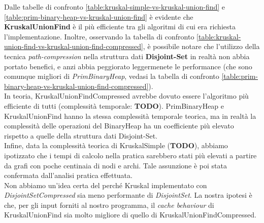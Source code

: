 \noindent Dalle tabelle di confronto \ref{table:kruskal-simple-vs-kruskal-union-find} e \ref{table:prim-binary-heap-vs-kruskal-union-find} è evidente che \textbf{KruskalUnionFind} è il più efficiente tra gli algoritmi di cui era richiesta l'implementazione. Inoltre, osservando la tabella di confronto \ref{table:kruskal-union-find-vs-kruskal-union-find-compressed}, è possibile notare che l'utilizzo della tecnica \textit{path-compression} nella struttura dati \textbf{Disjoint-Set} in realtà non abbia portato benefici, e anzi abbia peggiorato leggermenete le performance (che sono comunque migliori di \textit{PrimBinaryHeap}, vedasi la tabella di confronto \ref{table:prim-binary-heap-vs-kruskal-union-find-compressed}). \\

\noindent In teoria, KruskalUnionFindCompressed avrebbe dovuto essere l'algoritmo più efficiente di tutti (complessità temporale: \textbf{TODO}).
\noindent PrimBinaryHeap e KruskalUnionFind hanno la stessa complessità temporale teorica, ma in realtà la complessità delle operazioni del BinaryHeap ha un coefficiente più elevato rispetto a quelle della struttura dati Disjoint-Set. \\

\noindent Infine, data la complessità teorica di KruskalSimple (\textbf{TODO}), abbiamo ipotizzato che i tempi di calcolo nella pratica sarebbero stati più elevati a partire da grafi con poche centinaia di nodi e archi. Tale assunzione è poi stata confermata dall'analisi pratica effettuata. \\

\noindent Non abbiamo un'idea certa del perché Kruskal implementato con \textit{DisjointSetCompressed} sia meno performante di \textit{DisjointSet}. La nostra ipotesi è che, per gli input forniti al nostro programma, il \textit{cache behaviour} di KruskalUnionFind sia molto migliore di quello di KruskalUnionFindCompressed.

